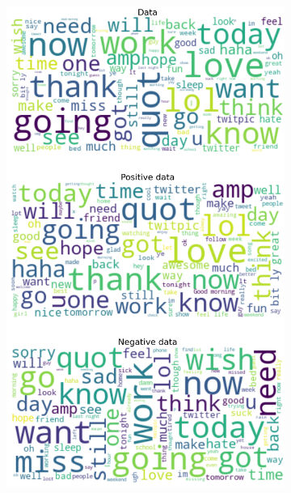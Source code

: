 \documentclass{article}
\begin{document}
\begin{itemize}
  \begin{figure}[H]
    \centering
    \captionsetup{justification=centering}
    \begin{subfigure}[b]{0.24\textwidth}
      \centering
      \includegraphics[width=\textwidth]{chapter-06/section-01-01/13/visualization/1/wordcloud.png}
    \end{subfigure}
    \begin{subfigure}[b]{0.24\textwidth}
      \centering

\end{subfigure}
\end{figure}
\end{itemize}
\end{document}

